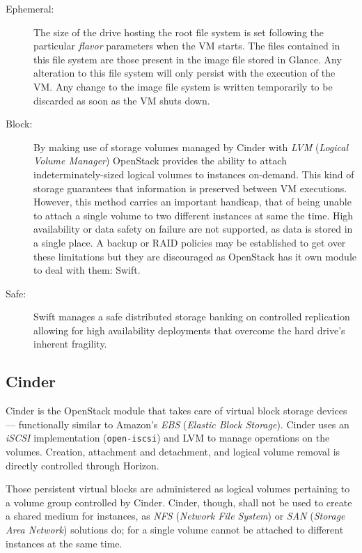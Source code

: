 \begin{description}
 \item[Ephemeral:] The size of the drive hosting the root file system is set following the particular \emph{flavor} parameters when the VM starts. The files contained in this file system are those present in the image file stored in Glance. Any alteration to this file system will only persist with the execution of the VM. Any change to the image file system is written temporarily to be discarded as soon as the VM shuts down.
 \item[Block:] By making use of storage volumes managed by Cinder with \emph{LVM} (\emph{Logical Volume Manager}) OpenStack provides the ability to attach indeterminately-sized logical volumes to instances on-demand. This kind of storage guarantees that information is preserved between VM executions. However, this method carries an important handicap, that of being unable to attach a single volume to two different instances at same the time. High availability or data safety on failure are not supported, as data is stored in a single place. A backup or RAID policies may be established to get over these limitations but they are discouraged as OpenStack has it own module to deal with them: Swift.
 \item[Safe:] Swift manages a safe distributed storage banking on controlled replication allowing for high availability deployments that overcome the hard drive's inherent fragility.
\end{description}

\subsection{Cinder}\label{subsec:cinder}
\noindent Cinder is the OpenStack module that takes care of virtual block storage devices --- functionally similar to Amazon's \emph{EBS} (\emph{Elastic Block Storage}). Cinder uses an \emph{iSCSI} implementation (\texttt{open-iscsi}) and LVM to manage operations on the volumes. Creation, attachment and detachment, and logical volume removal is directly controlled through Horizon.

Those persistent virtual blocks are administered as logical volumes pertaining to a volume group controlled by Cinder. Cinder, though, shall not be used to create a shared medium for instances, as \emph{NFS} (\emph{Network File System}) or \emph{SAN} (\emph{Storage Area Network}) solutions do; for a single volume cannot be attached to different instances at the same time.

